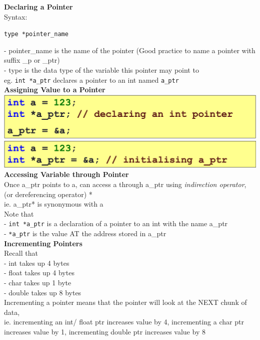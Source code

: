 \documentclass[10pt, a4paper]{article}
\begin{document}
\begin{multicols*}{3}
		\textbf{Declaring a Pointer}\\
		Syntax:
		\begin{center}
			\texttt{type *pointer\_name}\\
		\end{center}
		- pointer\_name is the name of the pointer (Good practice to name a pointer with suffix \_p or \_ptr)\\
		- type is the data type of the variable this pointer may point to\\
		eg. \texttt{int *a\_ptr} declares a pointer to an int named \texttt{a\_ptr}\\
		
		\textbf{Assigning Value to a Pointer}\\
		\includegraphics[scale=0.25]{./assets/pointerDeclaration}\\
		\includegraphics[scale=0.25]{./assets/pointerDeclaration2}\\
		
		\textbf{Accessing Variable through Pointer}\\
		Once a\_ptr points to a, can access a through a\_ptr using \textit{indirection operator}, (or dereferencing operator) *\\
		ie. a\_ptr* is synonymous with a\\
		
		Note that\\
		- \texttt{int *a\_ptr} is a declaration of a pointer to an int with the name a\_ptr\\
		- \texttt{*a\_ptr} is the value AT the address stored in a\_ptr\\
		
		\textbf{Incrementing Pointers}\\
		Recall that\\
		- int takes up 4 bytes\\
		- float takes up 4 bytes\\
		- char takes up 1 byte\\
		- double takes up 8 bytes\\
		Incrementing a pointer means that the pointer will look at the NEXT chunk of data,\\
		ie. incrementing an int/ float ptr increases value by 4, incrementing a char ptr increases value by 1, incrementing double ptr increases value by 8\\
		

\end{multicols*}
\end{document}
